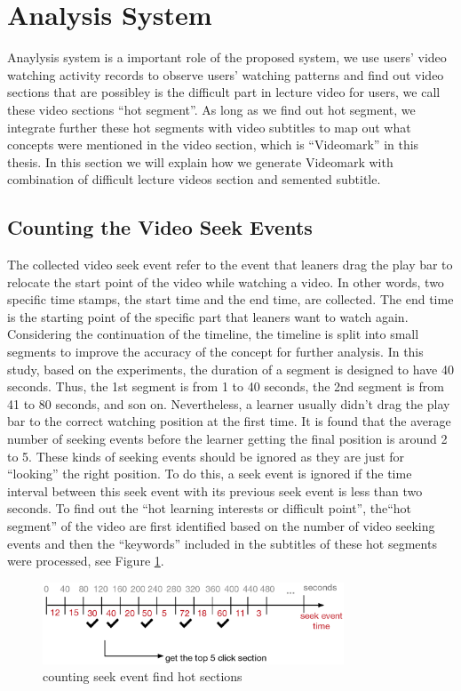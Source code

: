 \section{Analysis System}
Anaylysis system is a important role of the proposed system, we use users' video watching activity records to observe users' watching patterns and find out video sections that are possibley is the difficult part in lecture video for users, we call these video sections ``hot segment''.
As long as we find out hot segment, we integrate further these hot segments with video subtitles to map out what concepts were mentioned in the video section, which is ``Videomark'' in this thesis.
In this section we will explain how we generate Videomark with combination of difficult lecture videos section and semented subtitle.

\subsection{Counting the Video Seek Events}
The collected video seek event refer to the event that leaners drag the play bar to relocate the start point of the video while watching a video. In other words, two specific time stamps, the start time and the end time, are collected. The end time is the starting point of the specific part that leaners want to watch again.
Considering the continuation of the timeline, the timeline is split into small segments to improve the accuracy of the concept for further analysis. In this study, based on the experiments, the duration of a segment is designed to have 40 seconds. Thus, the 1st segment is from 1 to 40 seconds, the 2nd segment is from 41 to 80 seconds, and son on.
Nevertheless, a learner usually didn’t drag the play bar to the correct watching position at the first time. It is found that the average number of seeking events before the learner getting the final position is around 2 to 5. These kinds of seeking events should be ignored as they are just for “looking” the right position. To do this, a seek event is ignored if the time interval between this seek event with its previous seek event is less than two seconds.
To find out the ``hot learning interests or difficult point'', the``hot segment'' of the video are first identified based on the number of video seeking events and then the ``keywords'' included in the subtitles of these hot segments were processed, see Figure \ref{fig:countseek}.

\begin{figure}[H]
    \centering
    \includegraphics[width = 0.8\textwidth]{fig/countseek.eps}
    \caption{counting seek event find hot sections}
    \label{fig:countseek}
\end{figure}

